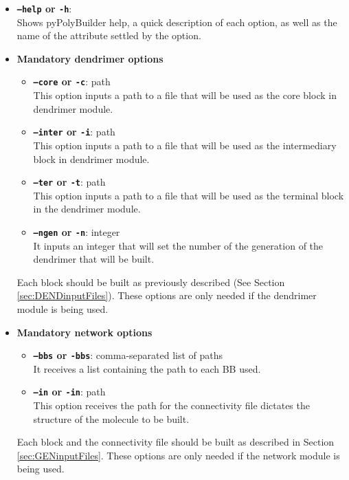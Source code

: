 \documentclass[12pt]{article}
\begin{document}
\begin{itemize}
  \item \textbf{\texttt{--help} or \texttt{-h}}:\\
    Shows pyPolyBuilder help, a quick description of each option, as well as the name of the attribute settled by the option.
    
  \item \textbf{Mandatory dendrimer options}
\begin{itemize}
  \item \textbf{\texttt{--core} or \texttt{-c}}: path\\
    This option inputs a path to a file that will be used as the core block in dendrimer module.
  \item \textbf{\texttt{--inter} or \texttt{-i}}: path\\
    This option inputs a path to a file that will be used as the intermediary block in dendrimer module.
  \item \textbf{\texttt{--ter} or \texttt{-t}}: path\\
    This option inputs a path to a file that will be used as the terminal block in the dendrimer module.
  \item \textbf{\texttt{--ngen} or \texttt{-n}}: integer\\
    It inputs an integer that will set the number of the generation of the dendrimer that will be built.
\end{itemize}

    Each block should be built as previously described (See Section \ref{sec:DENDinputFiles}).
    These options are only needed if the dendrimer module is being used.
    
  \item \textbf{Mandatory network options}
\begin{itemize}
  \item \textbf{\texttt{--bbs} or \texttt{-bbs}}: comma-separated list of paths\\
    It receives a list containing the path to each BB used.
  \item \textbf{\texttt{--in} or \texttt{-in}}: path\\
    This option receives the path for the connectivity file dictates the structure of the molecule to be built.
 \end{itemize}   
    
    Each block and the connectivity file should be built as described in Section \ref{sec:GENinputFiles}.
    These options are only needed if the network module is being used.
    

\end{itemize}
\end{document}
